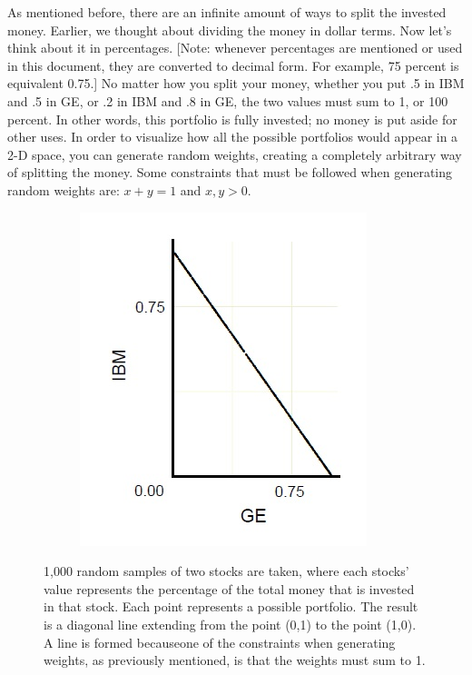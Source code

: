 \documentclass{article}\usepackage{graphicx, color}
\begin{document}
As mentioned before, there are an infinite amount of ways to split the invested money. Earlier, we thought about dividing the money in dollar terms. Now let's think about it in percentages. [Note: whenever percentages are mentioned or used in this document, they are converted to decimal form. For example, 75 percent is equivalent 0.75.] No matter how you split your money, whether you put .5 in IBM and .5 in GE, or .2 in IBM and .8 in GE, the two values must sum to 1, or 100 percent. In other words, this portfolio is fully invested; no money is put aside for other uses.
In order to visualize how all the possible portfolios would appear in a 2-D space, you can generate random weights, creating a completely arbitrary way of splitting the money. Some constraints that must be followed when generating random weights are: $x + y = 1$ and ${x, y} > 0$.

\begin{figure}[H]
  \begin{subfigure}[b]{0.7\textwidth}
      \centering
      \includegraphics[width=\textwidth]{samples}
      \label{fig:samples}
  \end{subfigure}
\caption{1,000 random samples of two stocks are taken, where each stocks' value represents the percentage of the total money that is invested in that stock. Each point represents a possible portfolio. The result is a diagonal line extending from the point (0,1) to the point (1,0). A line is formed becauseone of the constraints when generating weights, as previously mentioned, is that the weights must sum to 1.}
\end{figure}
\end{document}
